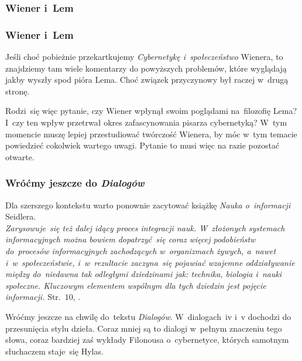 \documentclass[10pt,t]{beamer}
\begin{document}
\begin{frame}
  \frametitle{Wiener i~Lem}




\end{frame}





\begin{frame}
  \frametitle{Wiener i~Lem}


  Jeśli choć pobieżnie przekartkujemy \textit{Cybernetykę i~społeczeństwo}
  Wienera, to znajdziemy tam wiele komentarzy do powyższych problemów, które
  wyglądają jakby wyszły spod pióra Lema. Choć związek przyczynowy był
  raczej w~drugą stronę.



  Rodzi~się więc pytanie, czy Wiener wpłynął swoim poglądami na~filozofię
  Lema? I~czy ten wpływ przetrwał okres zafascynowania pisarza cybernetyką?
  W~tym momencie muszę lepiej przestudiować twórczość Wienera, by móc
  w~tym temacie powiedzieć cokolwiek wartego uwagi. Pytanie to musi więc
  na razie pozostać otwarte.

\end{frame}





\begin{frame}
  \frametitle{Wróćmy jeszcze do \textit{Dialogów}}


  Dla szerszego kontekstu warto ponownie zacytować książkę \textit{Nauka
    o~informacji} Seidlera. \\
  \textit{Zarysowuje~się też dalej idący proces integracji nauk.
    W~złożonych systemach informacyjnych można bowiem dopatrzyć~się
    coraz więcej podobieństw do~procesów informacyjnych zachodzących
    w~organizmach żywych, a~nawet i~w~społeczeństwie, i~w~rezultacie
    zaczyna~się pojawiać wzajemne oddziaływanie między do~niedawna tak
    odległymi dziedzinami jak: technika, biologia i~nauki społeczne.
    Kluczowym elementem wspólnym dla tych dziedzin jest pojęcie informacji.}
  Str.~$10$,
  \parencite{Seidler-Nauka-o-informacji-Vol-I-Pub-1983}.

  Wróćmy jeszcze na chwilę do~tekstu \textit{Dialogów}. W~dialogach~iv i~v
  dochodzi do przesunięcia stylu dzieła. Coraz mniej są to dialogi w~pełnym
  znaczeniu tego słowa, coraz bardziej zaś wykłady Filonousa o~cybernetyce,
  których samotnym słuchaczem staje~się Hylas.

\end{frame}
\end{document}

